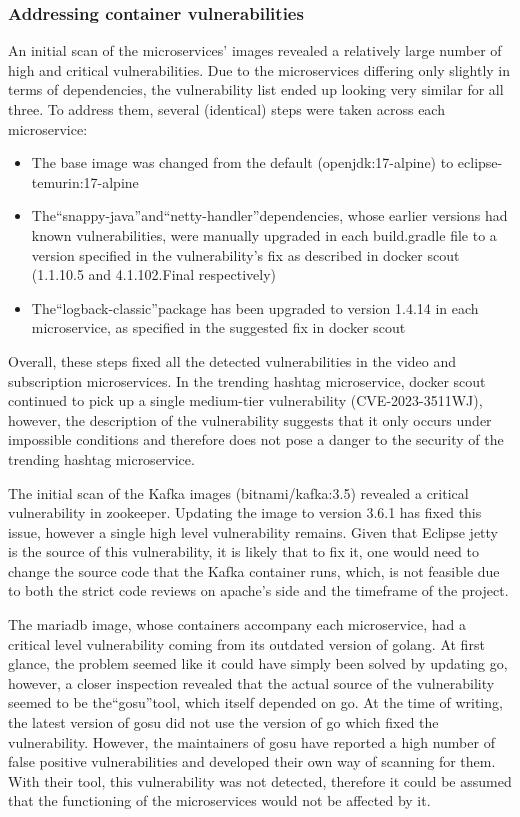 \documentclass[parskip=full]{article}
\begin{document}
    \subsubsection{Addressing container vulnerabilities}
    An initial scan of the microservices' images revealed a relatively large number of high and critical vulnerabilities.
    Due to the microservices differing only slightly in terms of dependencies, the vulnerability list ended up looking very similar for all three.
    To address them, several (identical) steps were taken across each microservice:
    \begin{itemize}
        \item The base image was changed from the default (openjdk:17-alpine) to eclipse-temurin:17-alpine
        \item The``snappy-java''and``netty-handler''dependencies, whose earlier versions had known vulnerabilities, were manually upgraded in each build.gradle file to a version specified in the vulnerability's fix as described in docker scout (1.1.10.5 and 4.1.102.Final respectively)
        \item The``logback-classic''package has been upgraded to version 1.4.14 in each microservice, as specified in the suggested fix in docker scout
    \end{itemize}
Overall, these steps fixed all the detected vulnerabilities in the video and subscription microservices.
In the trending hashtag microservice, docker scout continued to pick up a single medium-tier vulnerability (CVE-2023-3511WJ), however, the description of the vulnerability suggests that it only occurs under impossible conditions and therefore does not pose a danger to the security of the trending hashtag microservice.

The initial scan of the Kafka images (bitnami/kafka:3.5) revealed a critical vulnerability in zookeeper.
Updating the image to version 3.6.1 has fixed this issue, however a single high level vulnerability remains.
Given that Eclipse jetty is the source of this vulnerability, it is likely that to fix it, one would need to change the source code that the Kafka container runs, which, is not feasible due to both the strict code reviews on apache's side and the timeframe of the project.

The mariadb image, whose containers accompany each microservice, had a critical level vulnerability coming from its outdated version of golang.
At first glance, the problem seemed like it could have simply been solved by updating go, however, a closer inspection revealed that the actual source of the vulnerability seemed to be the``gosu''tool, which itself depended on go.
At the time of writing, the latest version of gosu did not use the version of go which fixed the vulnerability.
However, the maintainers of gosu have reported a high number of false positive vulnerabilities and developed their own way of scanning for them.
With their tool, this vulnerability was not detected, therefore it could be assumed that the functioning of the microservices would not be affected by it.
\end{document}
